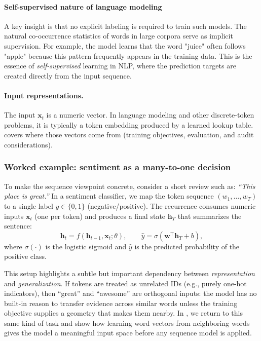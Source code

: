 \paragraph{Self-supervised nature of language modeling}

A key insight is that no explicit labeling is required to train such models. The natural co-occurrence statistics of words in large corpora serve as implicit supervision. For example, the model learns that the word "juice" often follows "apple" because this pattern frequently appears in the training data. This is the essence of \emph{self-supervised} learning in NLP, where the prediction targets are created directly from the input sequence.

\paragraph{Input representations.}
The input \(\mathbf{x}_t\) is a numeric vector. In language modeling and other discrete-token problems, it is typically a token embedding produced by a learned lookup table.  covers where those vectors come from (training objectives, evaluation, and audit considerations).

\subsubsection{Worked example: sentiment as a many-to-one decision}
\label{sec:rnn_sentiment_worked_example}

To make the sequence viewpoint concrete, consider a short review such as:
\emph{``This place is great.''}
In a sentiment classifier, we map the token sequence \((w_1,\ldots, w_T)\) to a single label \(y\in\{0,1\}\) (negative/positive). The recurrence consumes numeric inputs \(\mathbf{x}_t\) (one per token) and produces a final state \(\mathbf{h}_T\) that summarizes the sentence:
\begin{equation}
\mathbf{h}_t=f(\mathbf{h}_{t-1},\mathbf{x}_t;\theta),\qquad
\hat{y}=\sigma(\mathbf{w}^\top \mathbf{h}_T+b),
\label{eq:rnn_sentiment_many_to_one}
\end{equation}
where \(\sigma(\cdot)\) is the logistic sigmoid and \(\hat{y}\) is the predicted probability of the positive class.

This setup highlights a subtle but important dependency between \emph{representation} and \emph{generalization}. If tokens are treated as unrelated IDs (e.g., purely one-hot indicators), then ``great'' and ``awesome'' are orthogonal inputs: the model has no built-in reason to transfer evidence across similar words unless the training objective supplies a geometry that makes them nearby. In , we return to this same kind of task and show how learning word vectors from neighboring words gives the model a meaningful input space before any sequence model is applied.

